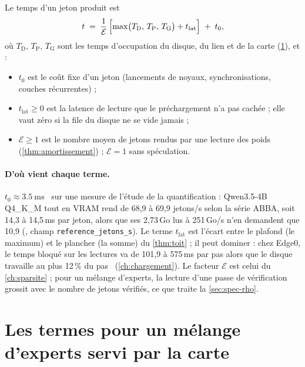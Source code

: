 \begin{definition}\label{def:equation-jeton}
Le temps d'un jeton produit est
\begin{equation}\label{eq:jeton}
t \;=\; \frac{1}{\mathcal E}\,\Bigl[\max\bigl(T_{\mathrm{D}},\,T_{\mathrm{P}},\,T_{\mathrm{G}}\bigr) + t_{\mathrm{lat}}\Bigr] \;+\; t_0 ,
\end{equation}
où $T_{\mathrm{D}}$, $T_{\mathrm{P}}$, $T_{\mathrm{G}}$ sont les temps d'occupation du disque, du lien et de la carte (\cref{sec:termes-moe}), et :
\begin{itemize}
\item $t_0$ est le coût fixe d'un jeton (lancements de noyaux, synchronisations, couches récurrentes) ;
\item $t_{\mathrm{lat}} \ge 0$ est la latence de lecture que le préchargement n'a pas cachée ; elle vaut zéro si la file du disque ne se vide jamais ;
\item $\mathcal E \ge 1$ est le nombre moyen de jetons rendus par une lecture des poids (\cref{thm:amortissement}) ; $\mathcal E = 1$ sans spéculation.
\end{itemize}
\end{definition}

\paragraph{D'où vient chaque terme.} $t_0 \approx \SI{3.5}{\milli\second}$ \calc~sur une mesure de l'étude de la quantification : Qwen3.5-4B Q4\_K\_M tout en VRAM rend de 68,9 à 69,9 jetons/s selon la série ABBA, soit 14,3 à 14,5\,ms par jeton, alors que ses 2,73\,Go lus à 251\,Go/s n'en demandent que 10,9 (, champ \texttt{reference\_jetons\_s}). Le terme $t_{\mathrm{lat}}$ est l'écart entre le plafond (le maximum) et le plancher (la somme) du \cref{thm:toit} ; il peut dominer : chez Edge0, le temps bloqué sur les lectures va de 101,9 à 575\,ms par pas alors que le disque travaille au plus 12\,\% du pas \litt~(\cref{ch:chargement}). Le facteur $\mathcal E$ est celui du \cref{ch:sparsite} ; pour un mélange d'experts, la lecture d'une passe de vérification grossit avec le nombre de jetons vérifiés, ce que traite la \cref{sec:spec-rho}.

\section{Les termes pour un mélange d'experts servi par la carte}\label{sec:termes-moe}


